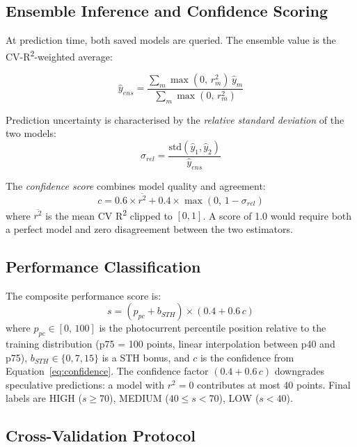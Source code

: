 \subsection{Ensemble Inference and Confidence Scoring}

At prediction time, both saved models are queried.
The ensemble value is the CV-R\textsuperscript{2}-weighted average:

\begin{equation}
  \hat{y}_{ens} = \frac{\sum_m \max(0,\,r^2_m)\,\hat{y}_m}{\sum_m \max(0,\,r^2_m)}
\end{equation}

Prediction uncertainty is characterised by the \emph{relative standard deviation}
of the two models:
\begin{equation}
  \sigma_{rel} = \frac{\text{std}(\hat{y}_1,\hat{y}_2)}{\hat{y}_{ens}}
\end{equation}

The \emph{confidence score} combines model quality and agreement:
\begin{equation}
  c = 0.6 \times \overline{r^2} + 0.4 \times \max(0,\,1 - \sigma_{rel})
  \label{eq:confidence}
\end{equation}
where $\overline{r^2}$ is the mean CV R\textsuperscript{2} clipped to $[0,1]$.
A score of 1.0 would require both a perfect model and zero disagreement between
the two estimators.

\subsection{Performance Classification}

The composite performance score is:
\begin{equation}
  s = \left(p_{pc} + b_{STH}\right) \times (0.4 + 0.6\,c)
  \label{eq:score}
\end{equation}
where $p_{pc} \in [0,\,100]$ is the photocurrent percentile position relative to
the training distribution (p75 = 100 points, linear interpolation between p40
and p75), $b_{STH} \in \{0, 7, 15\}$ is a STH bonus, and $c$ is the confidence
from Equation~\ref{eq:confidence}.
The confidence factor $(0.4 + 0.6\,c)$ downgrades speculative predictions:
a model with $r^2 = 0$ contributes at most 40 points.
Final labels are HIGH ($s \geq 70$), MEDIUM ($40 \leq s < 70$), LOW ($s < 40$).

\subsection{Cross-Validation Protocol}

